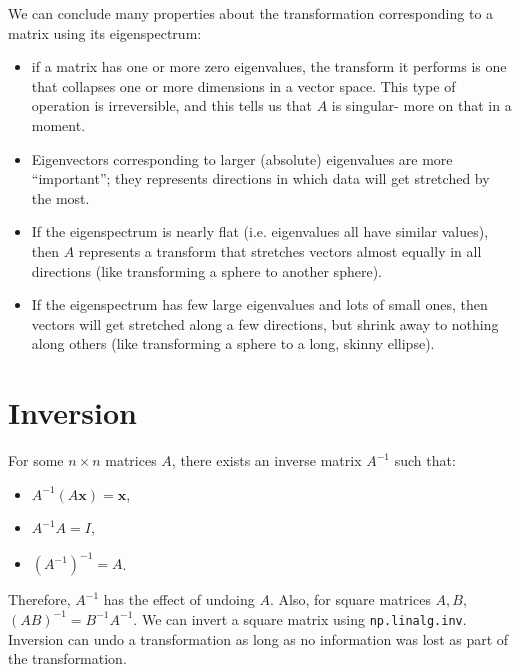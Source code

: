 \documentclass[a4paper, openany]{memoir}
\begin{document}
    We can conclude many properties about the transformation corresponding to a matrix using its eigenspectrum:
    \begin{itemize}
        \item if a matrix has one or more zero eigenvalues, the transform it performs is one that collapses one or more dimensions in a vector space. This type of operation is irreversible, and this tells us that $A$ is singular- more on that in a moment.
        \item Eigenvectors corresponding to larger (absolute) eigenvalues are more ``important''; they represents directions in which data will get stretched by the most.
        \item If the eigenspectrum is nearly flat (i.e. eigenvalues all have similar values), then $A$ represents a transform that stretches vectors almost equally in all directions (like transforming a sphere to another sphere).
        \item If the eigenspectrum has few large eigenvalues and lots of small ones, then vectors will get stretched along a few directions, but shrink away to nothing along others (like transforming a sphere to a long, skinny ellipse).
    \end{itemize}

    \section{Inversion}
    For some $n \times n$ matrices $A$, there exists an inverse matrix $A^{-1}$ such that:
    \begin{itemize}
        \item $A^{-1}(A \mathbf{x}) = \mathbf{x}$,
        \item $A^{-1}A = I$,
        \item $(A^{-1})^{-1} = A$.
    \end{itemize}
    Therefore, $A^{-1}$ has the effect of undoing $A$. 
    Also, for square matrices $A, B$, $(AB)^{-1} = B^{-1} A^{-1}$. We can invert a square matrix using \texttt{np.linalg.inv}. Inversion can undo a transformation as long as no information was lost as part of the transformation.
\end{document}
